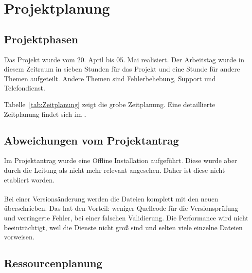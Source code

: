 \section{Projektplanung} 
\label{sec:Projektplanung}


\subsection{Projektphasen}
\label{sec:Projektphasen}

Das Projekt wurde vom 20. April bis 05. Mai realisiert. Der Arbeitstag wurde in diesem Zeitraum in sieben Stunden für das Projekt und eine Stunde für andere Themen aufgeteilt. Andere Themen sind \zB Fehlerbehebung, Support und Telefondienst. \*

Tabelle~\ref{tab:Zeitplanung} zeigt die grobe Zeitplanung.
Eine detaillierte Zeitplanung findet sich im .

\subsection{Abweichungen vom Projektantrag}
\label{sec:AbweichungenProjektantrag}

Im Projektantrag wurde eine Offline Installation aufgeführt. Diese wurde aber durch die Leitung als nicht mehr relevant angesehen. Daher ist diese nicht etabliert worden. \\
\\
Bei einer Versionsänderung werden die Dateien komplett mit den neuen überschrieben. Das hat den Vorteil: weniger Quellcode für die Versionsprüfung und verringerte Fehler, bei einer falschen Validierung. Die Performance wird nicht beeinträchtigt, weil die Dienste nicht groß sind und selten viele einzelne Dateien vorweisen. 

\subsection{Ressourcenplanung}
\label{sec:Ressourcenplanung}


